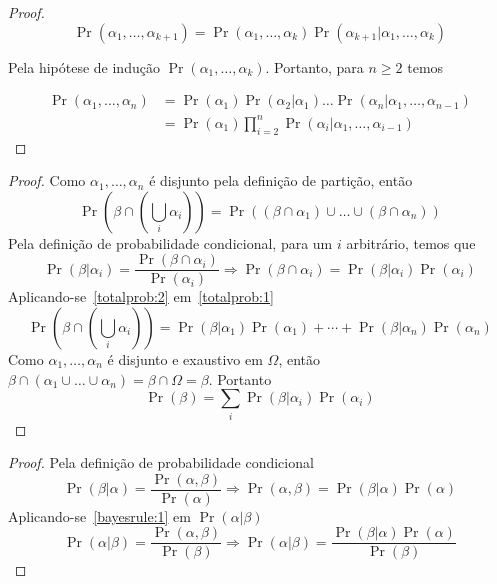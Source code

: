 \documentclass{amsart}
\theoremstyle{plain}
\numberwithin{equation}{subsection}
\renewcommand{\implies}{\Rightarrow}
\begin{document}
\begin{proof}
  \begin{equation*}
    \Pr(\alpha_1,\ldots,\alpha_{k+1})=\Pr(\alpha_1,\ldots,\alpha_k)\Pr(\alpha_{k+1}|
      \alpha_1,\ldots,\alpha_k)
  \end{equation*}

  Pela hipótese de indução $\Pr(\alpha_1,\ldots,\alpha_k)$. Portanto, para $n\geq2$ temos

  \begin{align*}
    \Pr(\alpha_1,\ldots,\alpha_n)&=\Pr(\alpha_1)\Pr(\alpha_2|\alpha_1)\ldots\Pr(\alpha_n|
      \alpha_1,\ldots,\alpha_{n-1})\\
      &=\Pr(\alpha_1)\prod_{i=2}^n\Pr(\alpha_i|\alpha_1,\ldots,\alpha_{i-1})
  \end{align*}
\end{proof}

\totalprob*
\begin{proof}
  Como $\alpha_1,\ldots,\alpha_n$ é disjunto pela definição de partição, então
  \begin{equation}\label{totalprob:1}
    \Pr(\beta\cap(\bigcup_i \alpha_i))=\Pr((\beta\cap\alpha_1)\cup\ldots\cup(\beta\cap\alpha_n))
  \end{equation}
  Pela definição de probabilidade condicional, para um $i$ arbitrário, temos que
  \begin{equation}\label{totalprob:2}
    \Pr(\beta|\alpha_i)=\frac{\Pr(\beta\cap\alpha_i)}{\Pr(\alpha_i)}\implies\Pr(\beta\cap\alpha_i)=
    \Pr(\beta|\alpha_i)\Pr(\alpha_i)
  \end{equation}
  Aplicando-se~\ref{totalprob:2} em~\ref{totalprob:1}
  \begin{equation*}
    \Pr(\beta\cap(\bigcup_i \alpha_i))=\Pr(\beta|\alpha_1)\Pr(\alpha_1)+\cdots+\Pr(\beta|\alpha_n)
    \Pr(\alpha_n)
  \end{equation*}
  Como $\alpha_1,\ldots,\alpha_n$ é disjunto e exaustivo em $\Omega$, então $\beta\cap(\alpha_1\cup
  \ldots\cup\alpha_n)=\beta\cap\Omega=\beta$. Portanto
  \begin{equation*}
    \Pr(\beta)=\sum_i \Pr(\beta|\alpha_i)\Pr(\alpha_i)
  \end{equation*}
\end{proof}

\bayesrule*
\begin{proof}
  Pela definição de probabilidade condicional
  \begin{equation}\label{bayesrule:1}
    \Pr(\beta|\alpha)=\frac{\Pr(\alpha,\beta)}{\Pr(\alpha)}\implies\Pr(\alpha,\beta)=\Pr(\beta|
    \alpha)\Pr(\alpha)
  \end{equation}
  Aplicando-se~\ref{bayesrule:1} em $\Pr(\alpha|\beta)$
  \begin{equation*}
    \Pr(\alpha|\beta)=\frac{\Pr(\alpha,\beta)}{\Pr(\beta)}\implies\Pr(\alpha|\beta)=\frac{\Pr(
    \beta|\alpha)\Pr(\alpha)}{\Pr(\beta)}
  \end{equation*}
\end{proof}

\newpage

\printbibliography[]
\end{document}
